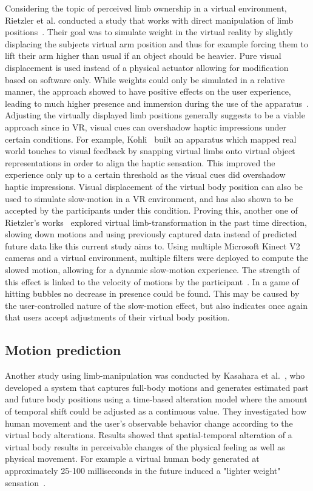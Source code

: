 \documentclass[sigconf]{acmart}
\begin{document}
Considering the topic of perceived limb ownership in a virtual environment, Rietzler et al. conducted a study that works with direct manipulation of limb positions~\cite{Rietzler2018a}.
Their goal was to simulate weight in the virtual reality by slightly displacing the subjects virtual arm position and thus for example forcing them to lift their arm higher than usual if an object should be heavier. 
Pure visual displacement is used instead of a physical actuator allowing for modification based on software only. 
While weights could only be simulated in a relative manner, the approach showed to have positive effects on the user experience, leading to much higher presence and immersion during the use of the apparatus~\cite{Rietzler2018a}.
Adjusting the virtually displayed limb positions generally suggests to be a viable approach since in VR, visual cues can overshadow haptic impressions under certain conditions. 
For example, Kohli~\cite{Kohli2010} built an apparatus which mapped real world touches to visual feedback by snapping virtual limbs onto virtual object representations in order to align the haptic sensation.
This improved the experience only up to a certain threshold as the visual cues did overshadow haptic impressions.
Visual displacement of the virtual body position can also be used to simulate slow-motion in a VR environment, and has also shown to be accepted by the participants under this condition.
Proving this, another one of Rietzler's works~\cite{Rietzler2018} explored virtual limb-transformation in the past time direction, slowing down motions and using previously captured data instead of predicted future data like this current study aims to. 
Using multiple Microsoft Kinect V2 cameras and a virtual environment, multiple filters were deployed to compute the slowed motion, allowing for a dynamic slow-motion experience.  
The strength of this effect is linked to the velocity of motions by the participant~\cite{Rietzler2018}. 
In a game of hitting bubbles no decrease in presence could be found.
This may be caused by the user-controlled nature of the slow-motion effect, but also indicates once again that users accept adjustments of their virtual body position.

\subsection{Motion prediction}
Another study using limb-manipulation was conducted by Kasahara et al.~\cite{Kasahara2017}, who developed a system that captures full-body motions and generates estimated past and future body positions using a time-based alteration model where the amount of temporal shift could be adjusted as a continuous value.
 They investigated how human movement and the user's observable behavior change according to the virtual body alterations.
Results showed that spatial-temporal alteration of a virtual body results in perceivable changes of the physical feeling as well as physical movement. For example a virtual human body generated at approximately 25-100 milliseconds in the future induced a "lighter weight" sensation~\cite{Kasahara2017}.
\end{document}
